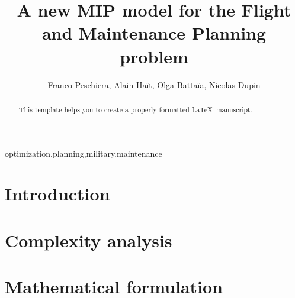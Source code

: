 \documentclass[review]{elsarticle}
\begin{document}
\begin{frontmatter}

\title{A new MIP model for the Flight and Maintenance Planning problem}

\author{Franco Peschiera, Alain Haït, Olga Battaïa, Nicolas Dupin}
\address{ISAE-SUPAERO, Université de Toulouse, France}





\begin{abstract}
This template helps you to create a properly formatted \LaTeX\ manuscript.
\end{abstract}

\begin{keyword}
optimization\sep planning\sep military\sep maintenance
\end{keyword}

\end{frontmatter}


\section{Introduction}

\section{Complexity analysis}


\section{Mathematical formulation}
\end{document}
